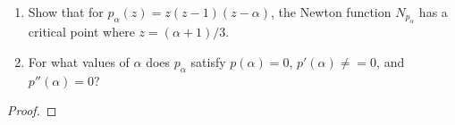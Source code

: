 \begin{problem}{6}
  \begin{enumerate}
    \item Show that for $p_\alpha(z) = z(z-1)(z-\alpha)$, the Newton function $N_{p_\alpha}$
      has a critical point where $z=(\alpha + 1)/3$.
    \item For what values of $\alpha$ does $p_\alpha$ satisfy $p(\alpha) = 0$, $p'(\alpha) \neq = 0$,
      and $p''(\alpha) = 0$?
  \end{enumerate}
\end{problem}

\begin{proof}
\end{proof}
\newpage
